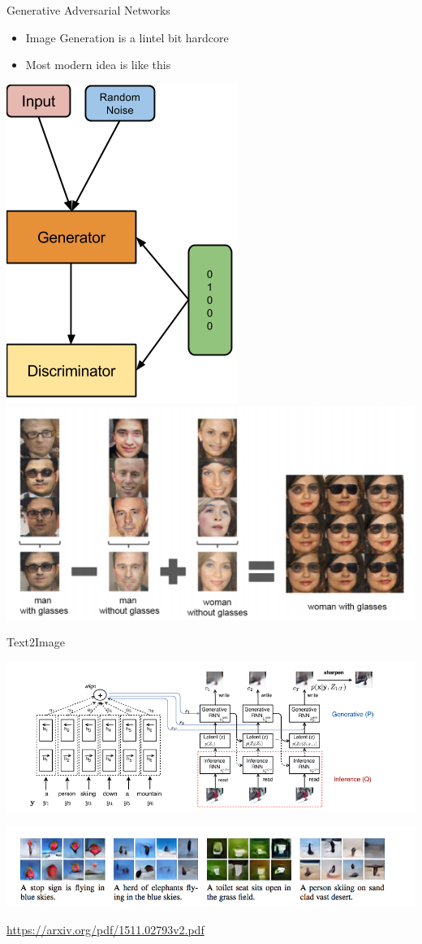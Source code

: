 \documentclass{beamer}
\begin{document}
\begin{frame}{Generative Adversarial Networks}
	\begin{itemize}
		\item Image Generation is a lintel bit hardcore
		\item Most modern idea is like this
	\end{itemize}
	\begin{center}
		\includegraphics[scale=0.3]{img/gan2}
		\includegraphics[scale=0.4]{img/gan1}
	\end{center}
\end{frame}

\begin{frame}{Text2Image}
		\begin{center}
			\includegraphics[scale=0.35]{img/t2i}
			
			\includegraphics[scale=0.4]{img/t2ie.png}			
		\end{center}
	\href{https://arxiv.org/pdf/1511.02793v2.pdf}{https://arxiv.org/pdf/1511.02793v2.pdf}
\end{frame}
\end{document}
